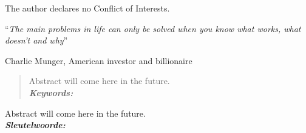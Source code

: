 \documentclass[
12pt, %
english, %
doublespacing, %
headsepline, %
]{MastersDoctoralThesis} %
\begin{document}
\begin{confli}
\addchaptertocentry{\confliname}
The author declares no Conflict of Interests.
\end{confli}

\cleardoublepage


\vspace*{0.2\textheight}

\noindent\enquote{\itshape The main problems in life can only be solved when you know what works, what doesn't and why}\bigbreak

\hfill Charlie Munger, American investor and billionaire


\begin{abstract}
\addchaptertocentry{\abstractname} %
Abstract will come here in the future.\\
\textit{\textbf{Keywords:}}
\end{abstract}

\begin{extraAbstract}
\addchaptertocentry{\abstractnameextra} %
Abstract will come here in the future.\\
\textit{\textbf{Sleutelwoorde:}}
\end{extraAbstract}

\end{document}
